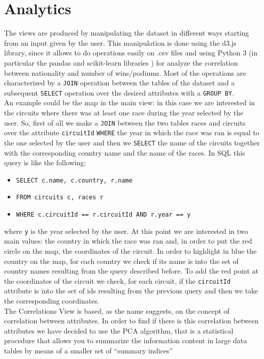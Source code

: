 \documentclass[10pt,twocolumn,letterpaper]{article}
\begin{document}
\section{Analytics}
The views are produced by manipulating the dataset in different ways starting from an input given by the user. This manipulation is done using the d3.js \cite{D3} library,
since it allows to do operations easily on .csv files and using Python 3 (in particular the pandas \cite{Pandas} and scikit-learn libraries \cite{Scikit-learn}) 
for analyze the correlation between nationality and number of wins/podiums. Most of the operations are characterized by a \texttt{JOIN} operation between the tables of the 
dataset and a subsequent \texttt{SELECT} operation over the desired attributes with a \texttt{GROUP BY}.\\
An example could be the map in the main view: in this case we are interested in the circuits where there was at least one race during the year selected by the user. So, first
of all we make a \texttt{JOIN} between the two tables races and circuits over the attribute \texttt{circuitId} \texttt{WHERE} the year in which the race was ran is equal to the
one selected by the user and then we \texttt{SELECT} the name of the circuits together with the corresponding country name and the name of the races. In SQL this query is like the
following:
\begin{itemize}
	\item \texttt{SELECT c.name, c.country, r.name}
	\item \texttt{FROM circuits c, races r}
	\item \texttt{WHERE c.circuitId == r.circuitId AND r.year == y}
\end{itemize}
where \texttt{y} is the year selected by the user.
At this point we are interested in two main values: the country in which the race was ran and, in order to put the red circle on the map, the coordinates of the circuit. In order to
highlight in blue the country on the map, for each country we check if its name is into the set of country names resulting from the query described before. To add the red point
at the coordinates of the circuit we check, for each circuit, if the \texttt{circuitId} attribute is into the set of ids resulting from the previous query and then we take the
corresponding coordinates.\\
The Correlations View is based, as the name suggests, on the concept of correlation between attributes. In order to find if there is this correlation between attributes we have
decided to use the PCA algorithm, that is a statistical procedure that allows you to summarize the information content in large data tables by means of a smaller set of “summary indices” 
\end{document}

